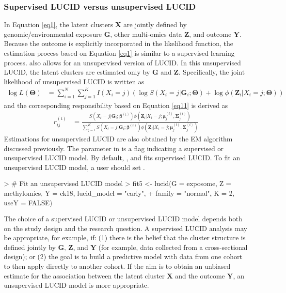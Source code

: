 \subsubsection{Supervised LUCID versus unsupervised LUCID} \label{sec3.1.2}
In Equation \ref{eq1}, the latent clusters $\bm X$ are jointly defined by genomic/environmental exposure $\bm G$, other multi-omics data $\bm Z$, and outcome $\bm Y$. Because the outcome is explicitly incorporated in the likelihood function, the estimation process based on Equation \ref{eq1} is similar to a supervised learning process.  also allows for an unsupervised version of LUCID. In this unsupervised LUCID, the latent clusters are estimated only by $\bm G$ and $\bm Z$. Specifically, the joint likelihood of unsupervised LUCID is written as
\begin{equation}
    \begin{aligned}
         \log L(\bm{\Theta}) & = \sum_{i = 1}^N \sum_{j=1}^K I(X_i = j) \left( \log S(X_i = j| \bm{G}_i; \bm{\Theta}) + \log \phi(\bm{Z}_i| X_i = j; \bm{\Theta})\right)
    \end{aligned}
    \label{eq11}
\end{equation}
and the corresponding responsibility based on Equation \ref{eq11} is derived as
\begin{equation}
    \begin{aligned}
        r_{ij}^{(t)} & = \frac{S\left(X_i = j| \bm{G}_i; \bm{\beta}^{(t)}\right) \phi\left(\bm{Z}_i| X_i = j; \bm{\mu}_j^{(t)}, \bm{\Sigma}_j^{(t)}\right)}{\sum_{j = 1}^K S\left(X_i = j| \bm{G}_i; \bm{\beta}^{(t)}\right) \phi\left(\bm{Z}_i| X_i = j; \bm{\mu}_j^{(t)}, \bm{\Sigma}_j^{(t)}\right)}
    \end{aligned}
    \label{eq12}
\end{equation}
Estimations for unsupervised LUCID are also obtained by the EM algorithm discussed previously. The parameter  in  is a flag indicating a supervised or unsupervised LUCID model. By default, , and  fits supervised LUCID. To fit an unsupervised LUCID model, a user should set .
\begin{example}
> # Fit an unsupervised LUCID model
> fit5 <- lucid(G = exposome, Z = methylomics, Y = ck18, lucid_model = "early", 
+               family = "normal", K = 2, useY = FALSE)
\end{example}
The choice of a supervised LUCID or unsupervised LUCID model depends both on the study design and the research question. A supervised LUCID analysis may be appropriate, for example, if: (1) there is the belief that the cluster structure is defined jointly by $\bm G$, $\bm Z$, and $\bm Y$ (for example, data collected from a cross-sectional design); or (2) the goal is to build a predictive model with data from one cohort to then apply directly to another cohort. If the aim is to obtain an unbiased estimate for the association between the latent cluster $\bm X$ and the outcome $\bm Y$, an unsupervised LUCID model is more appropriate.
